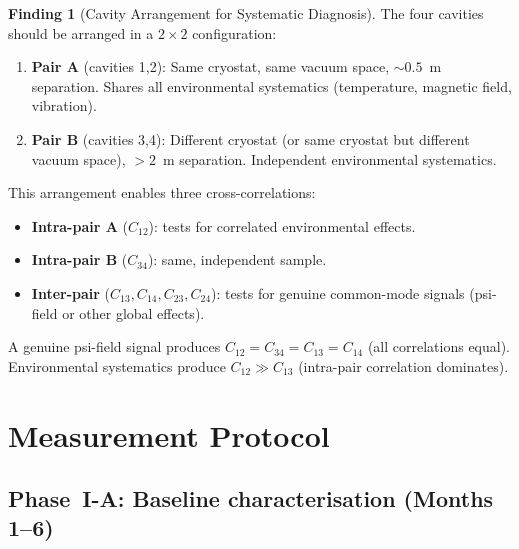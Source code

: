 \documentclass[11pt]{article}
\theoremstyle{definition}
\newtheorem{finding}[theorem]{Finding}
\theoremstyle{remark}
\begin{document}
\begin{finding}[Cavity Arrangement for Systematic Diagnosis]
\label{find:cavity_arrangement}
The four cavities should be arranged in a $2\times 2$ configuration:

\begin{enumerate}[nosep]
\item \textbf{Pair A} (cavities 1,2): Same cryostat, same vacuum
  space, $\sim 0.5$~m separation. Shares all environmental
  systematics (temperature, magnetic field, vibration).
\item \textbf{Pair B} (cavities 3,4): Different cryostat (or same
  cryostat but different vacuum space), $>2$~m separation. Independent
  environmental systematics.
\end{enumerate}

This arrangement enables three cross-correlations:
\begin{itemize}[nosep]
\item \textbf{Intra-pair A} ($C_{12}$): tests for correlated
  environmental effects.
\item \textbf{Intra-pair B} ($C_{34}$): same, independent sample.
\item \textbf{Inter-pair} ($C_{13}, C_{14}, C_{23}, C_{24}$): tests
  for genuine common-mode signals (psi-field or other global effects).
\end{itemize}

A genuine psi-field signal produces $C_{12} = C_{34} = C_{13} = C_{14}$
(all correlations equal). Environmental systematics produce
$C_{12} \gg C_{13}$ (intra-pair correlation dominates).
\end{finding}

\section{Measurement Protocol}
\label{sec:measurement_protocol}

\subsection{Phase~I-A: Baseline characterisation (Months 1--6)}
\end{document}
